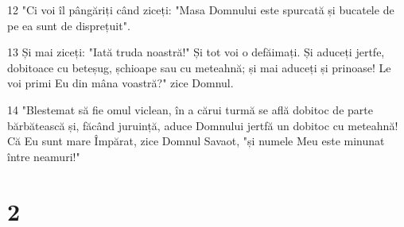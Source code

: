\par 12 "Ci voi îl pângăriți când ziceți: "Masa Domnului este spurcată și bucatele de pe ea sunt de disprețuit".
\par 13 Și mai ziceți: "Iată truda noastră!" Și tot voi o defăimați. Și aduceți jertfe, dobitoace cu beteșug, șchioape sau cu meteahnă; și mai aduceți și prinoase! Le voi primi Eu din mâna voastră?" zice Domnul.
\par 14 "Blestemat să fie omul viclean, în a cărui turmă se află dobitoc de parte bărbătească și, făcând juruință, aduce Domnului jertfă un dobitoc cu meteahnă! Că Eu sunt mare Împărat, zice Domnul Savaot, "și numele Meu este minunat între neamuri!"

\chapter{2}

